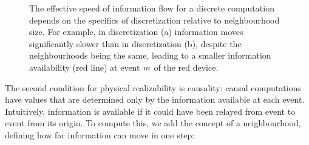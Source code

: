 \documentclass[12pt,a4paper,twoside,openright]{book}
\begin{document}
\begin{figure}
\centering
{}
\caption[Effective speed of information flow]{The effective speed of information flow for a discrete computation depends on the specifics of discretization relative to neighbourhood size.  For example, in discretization (a) information moves significantly slower than in discretization (b), despite the neighbourhoods being the same, leading to a smaller information availability (red line) at event $m$ of the red device.}
\label{f:approxspeed}
\end{figure}
\noindent
The second condition for physical realizability is causality: causal computations have values that are determined only by the information available at each event.
%
Intuitively, information is available if it could have been relayed from event to event from its origin.  To compute this, we add the concept of a neighbourhood, defining how far information can move in one step:
\end{document}
